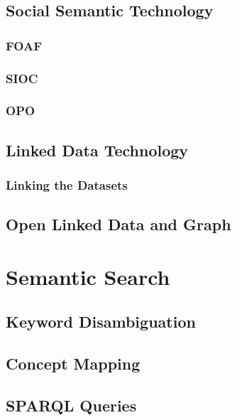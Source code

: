\subsection{Social Semantic Technology}
\subsubsection{FOAF}
\subsubsection{SIOC}
\subsubsection{OPO}
\subsection{Linked Data Technology}
\subsubsection{Linking the Datasets}
\subsection{Open Linked Data and Graph}

\section{Semantic Search}
\subsection{Keyword Disambiguation}
\subsection{Concept Mapping}
\subsection{SPARQL Queries}